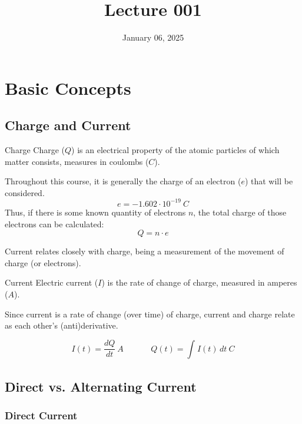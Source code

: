 \documentclass[12pt]{article}
\title{Lecture 001}
\date{January 06, 2025}
\begin{document}
\section{Basic Concepts}
\label{sec:basicConcepts}

\subsection{Charge and Current}
\label{ssec:chargeAndCurrent}

\begin{definition}{Charge}
  Charge ($Q$) is an electrical property of the atomic particles of which matter consists, measures in coulombs ($C$).
\end{definition}

Throughout this course, it is generally the charge of an electron  ($e$) that will be considered.
\begin{equation*}
  e = -1.602 \cdot 10^{-19}\ C
\end{equation*}
Thus, if there is some known quantity of electrons $n$, the total charge of those electrons can be calculated:
\begin{equation*}
  Q = n \cdot e
\end{equation*}

Current relates closely with charge, being a measurement of the movement of charge (or electrons).

\begin{definition}{Current}
  Electric current ($I$) is the rate of change of charge, measured in amperes ($A$).
\end{definition}

Since current is a rate of change (over time) of charge, current and charge relate as each other's (anti)derivative.

\begin{equation*}
  I(t) = \frac{dQ}{dt}\ A \ \ \ \ \ \ \ \ \ \ \ \ \ \ \ Q(t) = \int_{}^{} I(t) \,dt \ C
\end{equation*}

\subsection{Direct vs. Alternating Current}
\label{ssec:directVsAlternatingCurrent}

\subsubsection{Direct Current}
\label{sssec:directCurrent}
\end{document}

